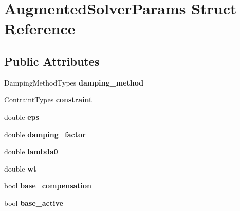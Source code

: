 \hypertarget{structAugmentedSolverParams}{\section{Augmented\-Solver\-Params Struct Reference}
\label{structAugmentedSolverParams}
}
\subsection*{Public Attributes}
\begin{DoxyCompactItemize}
\item 
\hypertarget{structAugmentedSolverParams_a549501781701c0cf231c6b1313ebd9b5}{Damping\-Method\-Types {\bfseries damping\-\_\-method}}\label{structAugmentedSolverParams_a549501781701c0cf231c6b1313ebd9b5}

\item 
\hypertarget{structAugmentedSolverParams_ad7bcb8bbe49c08c976793e334083f9a6}{Contraint\-Types {\bfseries constraint}}\label{structAugmentedSolverParams_ad7bcb8bbe49c08c976793e334083f9a6}

\item 
\hypertarget{structAugmentedSolverParams_a299dbe15f6695d6d5221a490fea3c188}{double {\bfseries eps}}\label{structAugmentedSolverParams_a299dbe15f6695d6d5221a490fea3c188}

\item 
\hypertarget{structAugmentedSolverParams_a5167aa2d98246f3e6a5df19fcf4a6f02}{double {\bfseries damping\-\_\-factor}}\label{structAugmentedSolverParams_a5167aa2d98246f3e6a5df19fcf4a6f02}

\item 
\hypertarget{structAugmentedSolverParams_a7a7a045f0a42c198734c807209e420e4}{double {\bfseries lambda0}}\label{structAugmentedSolverParams_a7a7a045f0a42c198734c807209e420e4}

\item 
\hypertarget{structAugmentedSolverParams_a3b67245bd57d82a1343b2f2951ff6f28}{double {\bfseries wt}}\label{structAugmentedSolverParams_a3b67245bd57d82a1343b2f2951ff6f28}

\item 
\hypertarget{structAugmentedSolverParams_abe75c00241ca51f186376bfe0aa0bcd6}{bool {\bfseries base\-\_\-compensation}}\label{structAugmentedSolverParams_abe75c00241ca51f186376bfe0aa0bcd6}

\item 
\hypertarget{structAugmentedSolverParams_aa61616ab3b62fc41eacc414c33f8fb89}{bool {\bfseries base\-\_\-active}}\label{structAugmentedSolverParams_aa61616ab3b62fc41eacc414c33f8fb89}


\end{DoxyCompactItemize}
